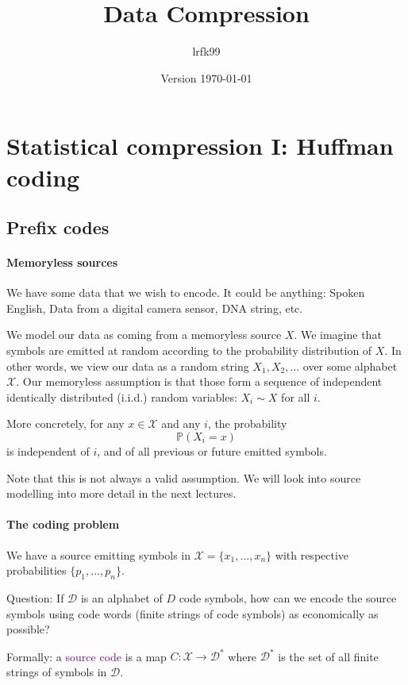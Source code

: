 \documentclass[a4paper, 11pt]{article}
\title{Data Compression}
\date{Version \today}
\author{lrfk99}
\numberwithin{equation}{section}
\theoremstyle{plain}
\theoremstyle{definition}
\newcommand{\probability}{\mathbb{P}}
\newcommand{\Define}[1]{\textcolor{purple}{#1}}
\begin{document}
\maketitle


\section{Statistical compression I: Huffman coding}
\label{sec:01}


\subsection{Prefix codes}

\paragraph{Memoryless sources}

We have some data that we wish to encode. It could be anything: Spoken English, Data from a digital camera sensor, DNA string, etc.

We model our data as coming from a memoryless source $X$. We imagine that symbols are emitted at random according to the probability distribution of $X$. In other words, we view our data as a random string $X_1, X_2, \dots$ over some alphabet $\mathcal{X}$. Our memoryless assumption is that those form a sequence of independent identically distributed (i.i.d.) random variables: $X_i \sim X$ for all $i$.

More concretely, for any $x \in \mathcal{X}$ and any $i$, the probability 
\[
    \probability(X_i = x)
\]
is independent of $i$, and of all previous or future emitted symbols.

Note that this is not always a valid assumption. We will look into source modelling into more detail in the next lectures.

\paragraph{The coding problem}

We have a source emitting symbols in $\mathcal{X} = \{x_1, \dots, x_n\}$ with respective probabilities  $\{p_1, \dots, p_n\}$.

Question: If  $\mathcal{D}$ is an alphabet of  $D$ code symbols, how can we encode the source symbols using code words (finite strings of code symbols) as economically as possible?

Formally: a \Define{source code} is a map $C : \mathcal{X} \to \mathcal{D}^*$
where  $\mathcal{D}^*$     is the set of all finite strings of symbols in  $\mathcal{D}$.
\end{document}
